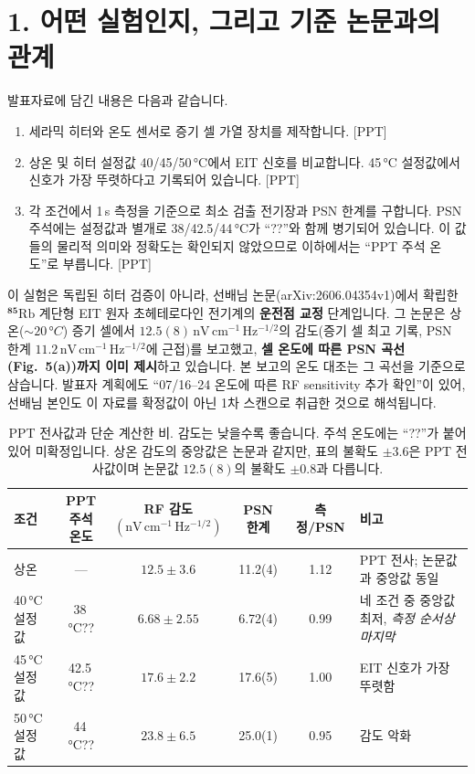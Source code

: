 \documentclass[10pt,a4paper]{article}
\newcommand{\Status}[1]{\textsf{\footnotesize[#1]}}
\newcommand{\sensunit}{\mathrm{nV\,cm^{-1}\,Hz^{-1/2}}}
\begin{document}
\section*{1. 어떤 실험인지, 그리고 기준 논문과의 관계}

발표자료에 담긴 내용은 다음과 같습니다.

\begin{enumerate}
  \setlength{\itemsep}{0.15em}
  \item 세라믹 히터와 온도 센서로 증기 셀 가열 장치를 제작합니다. \Status{PPT}
  \item 상온 및 히터 설정값 40/45/50\,°C에서 EIT 신호를 비교합니다. 45\,°C 설정값에서
        신호가 가장 뚜렷하다고 기록되어 있습니다. \Status{PPT}
  \item 각 조건에서 1\,s 측정을 기준으로 최소 검출 전기장과 PSN 한계를 구합니다. PSN 주석에는
        설정값과 별개로 38/42.5/44\,°C가 ``??''와 함께 병기되어 있습니다. 이 값들의 물리적 의미와
        정확도는 확인되지 않았으므로 이하에서는 ``PPT 주석 온도''로 부릅니다. \Status{PPT}
\end{enumerate}

이 실험은 독립된 히터 검증이 아니라, 선배님 논문(arXiv:2606.04354v1)에서 확립한
\(\mathbf{{}^{85}\mathrm{Rb}}\) 계단형 EIT 원자 초헤테로다인 전기계의 \textbf{운전점 교정} 단계입니다.
그 논문은 상온(\(\sim20\,°C\)) 증기 셀에서 \(12.5(8)\,\sensunit\)의 감도(증기 셀 최고 기록,
PSN 한계 \(11.2\,\sensunit\)에 근접)를 보고했고, \textbf{셀 온도에 따른 PSN 곡선(Fig.\ 5(a))까지
이미 제시}하고 있습니다. 본 보고의 온도 대조는 그 곡선을 기준으로 삼습니다.
발표자 계획에도 ``07/16--24 온도에 따른 RF sensitivity 추가 확인''이 있어, 선배님 본인도 이 자료를
확정값이 아닌 1차 스캔으로 취급한 것으로 해석됩니다.

\begin{table}[h]
\centering
\small
\caption{PPT 전사값과 단순 계산한 비. 감도는 낮을수록 좋습니다. 주석 온도에는 ``??''가 붙어 있어
미확정입니다. 상온 감도의 중앙값은 논문과 같지만, 표의 불확도 \(\pm3.6\)은 PPT 전사값이며
논문값 \(12.5(8)\)의 불확도 \(\pm0.8\)과 다릅니다.}
\setlength{\tabcolsep}{4.4pt}
\begin{tabularx}{\textwidth}{@{}lcccc>{\raggedright\arraybackslash}X@{}}
\toprule
조건 & \shortstack{PPT 주석\\온도} & \shortstack{RF 감도\\\((\sensunit)\)} & PSN 한계 & 측정/PSN & 비고\\
\midrule
상온 & --- & \(12.5\pm3.6\) & 11.2(4) & 1.12 & PPT 전사; 논문값과 중앙값 동일\\
40\,°C 설정값 & 38\,°C?? & \(\mathbf{6.68\pm2.55}\) & 6.72(4) & 0.99 & 네 조건 중 중앙값 최저, \emph{측정 순서상 마지막}\\
45\,°C 설정값 & 42.5\,°C?? & \(17.6\pm2.2\) & 17.6(5) & 1.00 & EIT 신호가 가장 뚜렷함\\
50\,°C 설정값 & 44\,°C?? & \(23.8\pm6.5\) & 25.0(1) & 0.95 & 감도 악화\\
\bottomrule
\end{tabularx}
\end{table}
\end{document}
